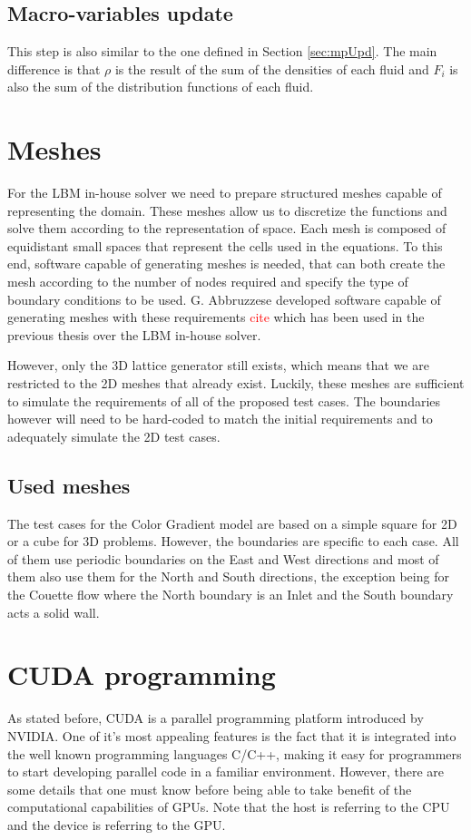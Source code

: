 \documentclass[12pt]{book}
\begin{document}
\subsection{Macro-variables update}
This step is also similar to the one defined in Section \ref{sec:mpUpd}. The main difference is that $\rho$ is the result of the sum of the densities of each fluid and $F_i$ is also the sum of the distribution functions of each fluid. 
\section{Meshes}
For the LBM in-house solver we need to prepare structured meshes capable of representing the domain. These meshes allow us to discretize the functions and solve them according to the representation of space. Each mesh is composed of equidistant small spaces that represent the cells used in the equations. To this end, software capable of generating meshes is needed, that can both create the mesh according to the number of nodes required and specify the type of boundary conditions to be used. G. Abbruzzese developed software capable of generating meshes with these requirements \textcolor{red}{cite} which has been used in the previous thesis over the LBM in-house solver. \par
However, only the 3D lattice generator still exists, which means that we are restricted to the 2D meshes that already exist. Luckily, these meshes are sufficient to simulate the requirements of all of the proposed test cases. The boundaries however will need to be hard-coded to match the initial requirements and to adequately simulate the 2D test cases.
\subsection{Used meshes}
The test cases for the Color Gradient model are based on a simple square for 2D or a cube for 3D problems. However, the boundaries are specific to each case. All of them use periodic boundaries on the East and West directions and most of them also use them for the North and South directions, the exception being for the Couette flow where the North boundary is an Inlet and the South boundary acts a solid wall.
\section{CUDA programming}
As stated before, CUDA is a parallel programming platform introduced by NVIDIA. One of it's most appealing features is the fact that it is integrated into the well known programming languages C/C++, making it easy for programmers to start developing parallel code in a familiar environment. However, there are some details that one must know before being able to take benefit of the computational capabilities of GPUs. Note that the host is referring to the CPU and the device is referring to the GPU.
\end{document}
